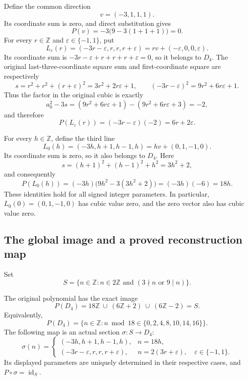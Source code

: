 Define the common direction
\[
 v=(-3,1,1,1).
 \label{d4i:eq:common-direction}\tag{D4I6}
\]
Its coordinate sum is zero, and direct substitution gives
\[
                   P(v)=-3\bigl(9-3(1+1+1)\bigr)=0.
\]
For every $r\in\mathbb Z$ and $\varepsilon\in\{-1,1\}$, put
\[
 L_\varepsilon(r)=(-3r-\varepsilon,r,r,r+\varepsilon)
                =rv+(-\varepsilon,0,0,\varepsilon).
 \label{d4i:eq:two-lines}\tag{D4I7}
\]
Its coordinate sum is
$-3r-\varepsilon+r+r+r+\varepsilon=0$, so it belongs to $D_4$.
The original last-three-coordinate square sum and first-coordinate
square are respectively
\[
 s=r^2+r^2+(r+\varepsilon)^2=3r^2+2r\varepsilon+1,
 \qquad (-3r-\varepsilon)^2=9r^2+6r\varepsilon+1.
\]
Thus the factor in the original cubic is exactly
\[
 a_0^2-3s=(9r^2+6r\varepsilon+1)
                 -(9r^2+6r\varepsilon+3)=-2,
\]
and therefore
\[
 P(L_\varepsilon(r))=(-3r-\varepsilon)(-2)=6r+2\varepsilon.
 \label{d4i:eq:two-line-values}\tag{D4I8}
\]

For every $h\in\mathbb Z$, define the third line
\[
 L_0(h)=(-3h,h+1,h-1,h)=hv+(0,1,-1,0).
 \label{d4i:eq:third-line}\tag{D4I9}
\]
Its coordinate sum is zero, so it also belongs to $D_4$. Here
\[
 s=(h+1)^2+(h-1)^2+h^2=3h^2+2,
\]
and consequently
\[
 P(L_0(h))=(-3h)\bigl(9h^2-3(3h^2+2)\bigr)
                         =(-3h)(-6)=18h.
 \label{d4i:eq:third-line-values}\tag{D4I10}
\]
These identities hold for all signed integer parameters. In particular,
$L_0(0)=(0,1,-1,0)$ has cubic value zero, and the zero vector also
has cubic value zero.

\subsection{The global image and a proved reconstruction map}
\label{d4i:sec:global-image}

Set
\[
 S=\{n\in\mathbb Z:n\in2\mathbb Z\text{ and }
                                  (3\nmid n\text{ or }9\mid n)\}.
 \label{d4i:eq:image-domain}\tag{D4I11}
\]

\begin{theorem}
\label{d4i:thm:complete-image}
The original polynomial has the exact image
\[
 P(D_4)=18\mathbb Z\ \cup\ (6\mathbb Z+2)\ \cup\ (6\mathbb Z-2)=S.
 \label{d4i:eq:complete-image}\tag{D4I12}
\]
Equivalently,
\[
 P(D_4)=\{n\in\mathbb Z:
                 n\bmod18\in\{0,2,4,8,10,14,16\}\}.
 \label{d4i:eq:residue-image}\tag{D4I13}
\]
The following map is an actual section $\sigma:S\to D_4$:
\[
 \sigma(n)=
 \begin{cases}
 (-3h,h+1,h-1,h),&n=18h,\\
 (-3r-\varepsilon,r,r,r+\varepsilon),
        &n=2(3r+\varepsilon),\quad\varepsilon\in\{-1,1\}.
 \end{cases}
 \label{d4i:eq:global-section}\tag{D4I14}
\]
Its displayed parameters are uniquely determined in their respective
cases, and $P\circ\sigma=\operatorname{id}_S$.
\end{theorem}


